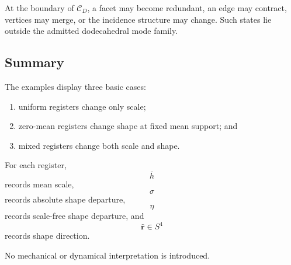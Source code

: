 At the boundary of \(\mathcal C_D\), a facet may become redundant, an edge
may contract, vertices may merge, or the incidence structure may change.
Such states lie outside the admitted dodecahedral mode family.

\subsection{Summary}

The examples display three basic cases:

\begin{enumerate}
\item uniform registers change only scale;
\item zero-mean registers change shape at fixed mean support; and
\item mixed registers change both scale and shape.
\end{enumerate}

For each register,
\[
\bar h
\]
records mean scale,
\[
\sigma
\]
records absolute shape departure,
\[
\eta
\]
records scale-free shape departure, and
\[
\widehat{\mathbf r}\in S^4
\]
records shape direction.

No mechanical or dynamical interpretation is introduced.
